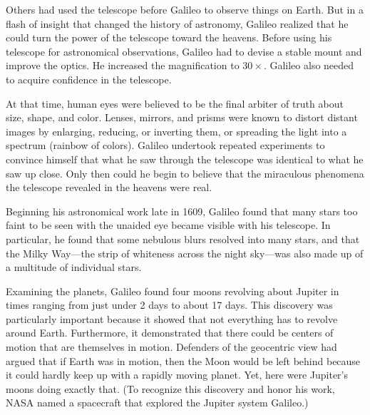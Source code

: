 \documentclass[../../main-astronomy.tex]{subfiles}
\begin{document}
\vspace{1em}

Others had used the telescope before Galileo to observe things on Earth. But in a flash of insight that changed the history of astronomy, Galileo realized that he could turn the power of the telescope toward the heavens. Before using his telescope for astronomical observations, Galileo had to devise a stable mount and improve the optics. He increased the magnification to $30\times$. Galileo also needed to acquire confidence in the telescope.

\vspace{1em}

At that time, human eyes were believed to be the final arbiter of truth about size, shape, and color. Lenses, mirrors, and prisms were known to distort distant images by enlarging, reducing, or inverting them, or spreading the light into a spectrum (rainbow of colors). Galileo undertook repeated experiments to convince himself that what he saw through the telescope was identical to what he saw up close. Only then could he begin to believe that the miraculous phenomena the telescope revealed in the heavens were real.

\vspace{1em}

Beginning his astronomical work late in 1609, Galileo found that many stars too faint to be seen with the unaided eye became visible with his telescope. In particular, he found that some nebulous blurs resolved into many stars, and that the Milky Way---the strip of whiteness across the night sky---was also made up of a multitude of individual stars.

\vspace{1em}

Examining the planets, Galileo found four moons revolving about Jupiter in times ranging from just under 2 days to about 17 days. This discovery was particularly important because it showed that not everything has to revolve around Earth. Furthermore, it demonstrated that there could be centers of motion that are themselves in motion. Defenders of the geocentric view had argued that if Earth was in motion, then the Moon would be left behind because it could hardly keep up with a rapidly moving planet. Yet, here were Jupiter's moons doing exactly that. (To recognize this discovery and honor his work, NASA named a spacecraft that explored the Jupiter system Galileo.)

\vspace{1em}
\end{document}

